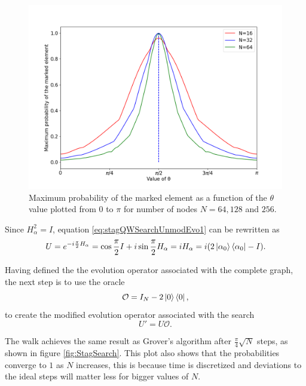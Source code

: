 \documentclass[../../dissertation.tex]{subfiles}
\begin{document}
\begin{figure}[!h]
	\centering
	\includegraphics[scale=0.40]{img/StagQuantumWalk/Search/Theta163264.png}
	\caption{Maximum probability of the marked element as a function of the $\theta$ value plotted from $0$ to $\pi$ for number of nodes $N=64,128$ and $256$.} 
	\label{fig:stagMultTheta}
\end{figure}
Since $H_\alpha^2 = I$, equation \ref{eq:stagQWSearchUnmodEvo1} can be rewritten as
\begin{equation}
	U = e^{-i\frac{\pi}{2} H_\alpha} = \cos{\frac{\pi}{2}I} + i\sin{\frac{\pi}{2}H_\alpha} = i H_\alpha = i(2\ket{\alpha_0}\bra{\alpha_0} - I).
\end{equation}\par
Having defined the the evolution operator associated with the complete graph, the next step is to use the oracle
\begin{equation}
	\mathcal{O} = I_N - 2\ket{0}\bra{0},
\end{equation}
to create the modified evolution operator associated with the search
\begin{equation}
	U' = U\mathcal{O}.
\end{equation}\par
The walk achieves the same result as Grover's algorithm after $\frac{\pi}{4}\sqrt{N}$ steps, as shown in figure \ref{fig:StagSearch}. This plot also shows that the probabilities converge to $1$ as $N$ increases, this is because time is discretized and deviations to the ideal steps will matter less for bigger values of $N$.
\end{document}
